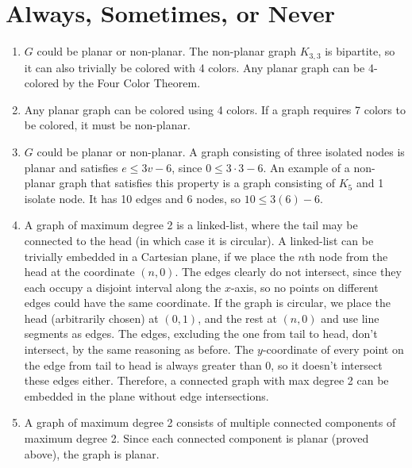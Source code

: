 \documentclass{article}
\begin{document}
\section{Always, Sometimes, or Never}
\begin{enumerate}[label=(\alph*)]
	\item $G$ could be planar or non-planar. The non-planar graph $K_{3,3}$ is bipartite, so it can also trivially be colored with 4 colors. Any planar graph can be 4-colored by the Four Color Theorem.
	\item Any planar graph can be colored using 4 colors. If a graph requires 7 colors to be colored, it must be non-planar.
	\item $G$ could be planar or non-planar. A graph consisting of three isolated nodes is planar and satisfies $e \leq 3v-6$, since $0 \leq 3\cdot 3-6$. An example of a non-planar graph that satisfies this property is a graph consisting of $K_5$ and 1 isolate node. It has 10 edges and 6 nodes, so $10 \leq 3(6)-6$. 
	\item A graph of maximum degree 2 is a linked-list, where the tail may be connected to the head (in which case it is circular). A linked-list can be trivially embedded in a Cartesian plane, if we place the $n$th node from the head at the coordinate $(n, 0)$. The edges clearly do not intersect, since they each occupy a disjoint interval along the $x$-axis, so no points on different edges could have the same coordinate. If the graph is circular, we place the head (arbitrarily chosen) at $(0, 1)$, and the rest at $(n, 0)$ and use line segments as edges. The edges, excluding the one from tail to head, don't intersect, by the same reasoning as before. The $y$-coordinate of every point on the edge from tail to head is always greater than 0, so it doesn't intersect these edges either. Therefore, a connected graph with max degree 2 can be embedded in the plane without edge intersections.
	\item A graph of maximum degree 2 consists of multiple connected components of maximum degree 2. Since each connected component is planar (proved above), the graph is planar.
\end{enumerate}
\end{document}

